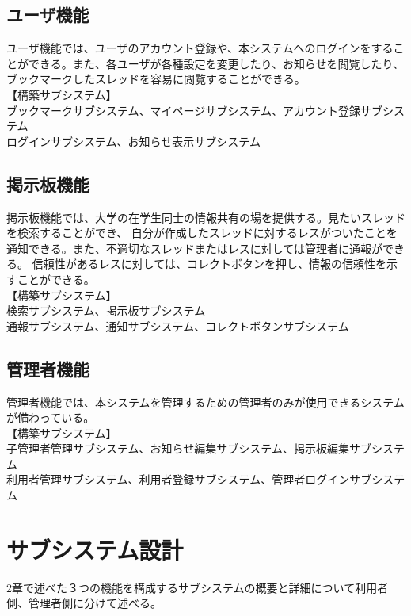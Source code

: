 \documentclass[a4j]{jarticle}
\begin{document}
\subsection{ユーザ機能}
 ユーザ機能では、ユーザのアカウント登録や、本システムへのログインをすることができる。また、各ユーザが各種設定を変更したり、お知らせを閲覧したり、ブックマークしたスレッドを容易に閲覧することができる。
\\【構築サブシステム】
\\ ブックマークサブシステム、マイページサブシステム、アカウント登録サブシステム
\\ ログインサブシステム、お知らせ表示サブシステム

\subsection{掲示板機能}
 掲示板機能では、大学の在学生同士の情報共有の場を提供する。見たいスレッドを検索することができ、
 自分が作成したスレッドに対するレスがついたことを通知できる。また、不適切なスレッドまたはレスに対しては管理者に通報ができる。
 信頼性があるレスに対しては、コレクトボタンを押し、情報の信頼性を示すことができる。
\\【構築サブシステム】
\\ 検索サブシステム、掲示板サブシステム
\\ 通報サブシステム、通知サブシステム、コレクトボタンサブシステム

\subsection{管理者機能}
 管理者機能では、本システムを管理するための管理者のみが使用できるシステムが備わっている。
\\【構築サブシステム】
\\ 子管理者管理サブシステム、お知らせ編集サブシステム、掲示板編集サブシステム
\\ 利用者管理サブシステム、利用者登録サブシステム、管理者ログインサブシステム

\section{サブシステム設計}
2章で述べた３つの機能を構成するサブシステムの概要と詳細について利用者側、管理者側に分けて述べる。
\end{document}
